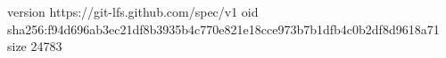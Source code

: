 version https://git-lfs.github.com/spec/v1
oid sha256:f94d696ab3ec21df8b3935b4c770e821e18cce973b7b1dfb4c0b2df8d9618a71
size 24783
